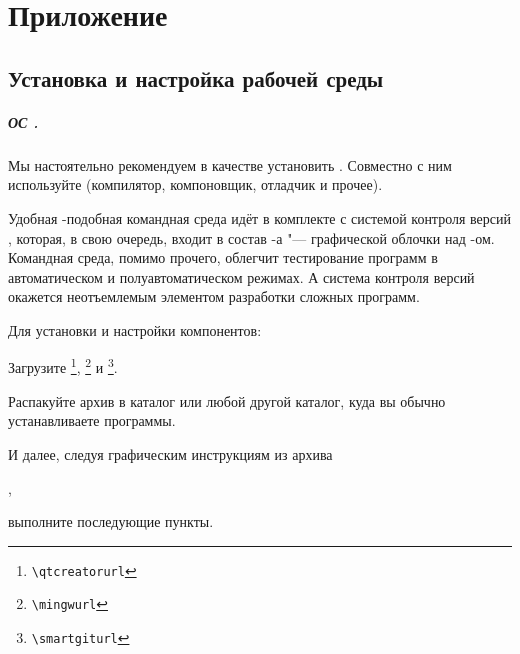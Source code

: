 
\chapter{Приложение}
\section{Установка и настройка рабочей среды}\label{sect:workEnv}
{ %
\newcommand*{\hotkey}[1]{\fbox{\texttt{\small #1}}}
\newcommand*{\hotplus}{{\small\,+\,}}
\newcommand*{\hotkeys}[2]{\hotkey{#1}\hotplus\hotkey{#2}}
\newcommand*{\hotkeyss}[3]{\hotkey{#1}\hotplus\hotkey{#2}\hotplus\hotkey{#3}}



\paragraph{ОС .}
Мы настоятельно рекомендуем в качестве  установить . Совместно с ним используйте  (компилятор, компоновщик, отладчик и прочее).

Удобная -подобная командная среда  идёт в комплекте с системой контроля версий \href{\giturl}{\git}, которая, в свою очередь, входит в состав -а "--- графической облочки над \git-ом. Командная среда, помимо прочего, облегчит тестирование программ в автоматическом и полуавтоматическом режимах. А система контроля версий окажется неотъемлемым элементом разработки сложных программ.

Для установки и настройки компонентов:
\begin{itemfeature}
\item Загрузите \href{\qtcreatorurl}{}\footnote{\nolinkurl{\qtcreatorurl}}, \href{\mingwurl}{}\footnote{\nolinkurl{\mingwurl}} и \href{\smartgiturl}{}\footnote{\nolinkurl{\smartgiturl}}.

\item Распакуйте архив  в каталог  или любой другой каталог, куда вы обычно устанавливаете программы.

И далее, следуя графическим инструкциям из архива
\begin{flushleft}
	,
\end{flushleft}
выполните последующие пункты.


\end{itemfeature}}
